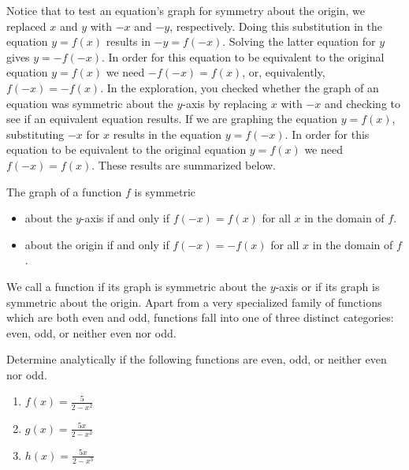 \documentclass[nooutcomes]{ximera}
\begin{document}
Notice that to test an equation's graph for symmetry about the origin, we replaced $x$ and $y$ with $-x$ and $-y$, respectively.  Doing this substitution in the equation $y = f(x)$ results in $-y = f(-x)$.  Solving the latter equation for $y$ gives $y = -f(-x)$.  In order for this equation to be equivalent to the original equation $y=f(x)$ we need $-f(-x) = f(x)$, or, equivalently, $f(-x) = -f(x)$. In the exploration, you checked whether the graph of an equation was symmetric about the $y$-axis by replacing $x$ with $-x$ and checking to see if an equivalent equation results.  If we are graphing the equation $y=f(x)$, substituting $-x$ for $x$ results in the equation $y=f(-x)$.  In order for this equation to be equivalent to the original equation $y=f(x)$ we need $f(-x) = f(x)$. These results are summarized below.

The graph of a function $f$ is symmetric 

\begin{itemize}

\item  about the $y$-axis if and only if $f(-x) = f(x)$ for all $x$ in the domain of $f$.

\item  about the origin if and only if $f(-x) = -f(x)$ for all $x$ in the domain of $f$.

\end{itemize}

\begin{definition}
We call a function  if its graph is symmetric about the $y$-axis or  if its graph is symmetric about the origin.  Apart from a very specialized family of functions which are both even and odd, functions fall into one of three distinct categories: even, odd, or neither even nor odd.  
\end{definition}

\begin{example}
Determine analytically if the following functions are even, odd, or neither even nor odd. 
\begin{enumerate}
\item $f(x) = \frac{5}{2 - x^2}$ 
\item $g(x) = \frac{5x}{2 - x^2}$ 
\item $h(x) = \frac{5x}{2 - x^3}$
\end{enumerate}
\end{example}
\end{document}
